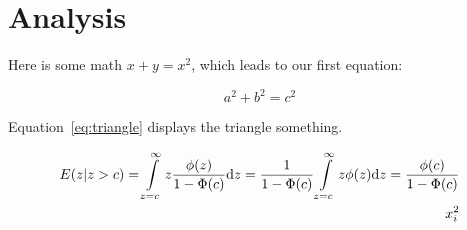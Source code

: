 \section{Analysis}
\label{sec:analysis}

Here is some math $x + y = x^2$, which leads to our first equation:

\begin{equation}
  a^2 + b^2 = c^2
  \label{eg:triangle}
\end{equation}

Equation~\ref{eq:triangle} displays the triangle something.

\begin{align}
  E(z|z>c) =
  \int\limits_{z=c}^{\infty} z \frac{\phi{(z)}}{1-\Phi(c)} \textnormal{d}z =
  \frac{1}{1-\Phi(c)} \int\limits_{z=c}^{\infty}z\phi(z)\textnormal{d}z =
  \frac{\phi(c)}{1 - \Phi(c)} \nonumber \\
  x_{i}^{2}
\end{align}

